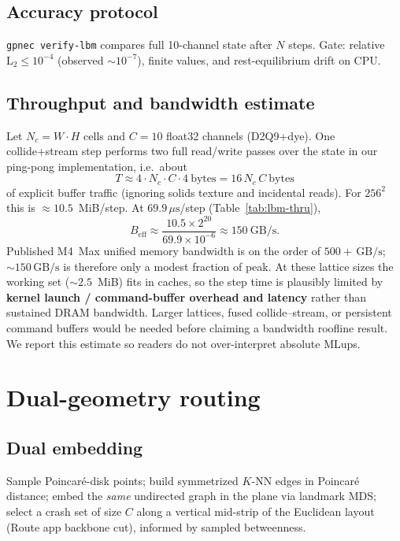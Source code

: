 \documentclass[11pt,a4paper]{article}
\begin{document}
\subsection{Accuracy protocol}
\texttt{gpnec verify-lbm} compares full 10-channel state after $N$ steps.
Gate: relative $\mathrm{L}_2\le10^{-4}$ (observed $\sim10^{-7}$), finite
values, and rest-equilibrium drift on CPU.

\subsection{Throughput and bandwidth estimate}
Let $N_c=W\cdot H$ cells and $C=10$ float32 channels (D2Q9+dye). One
collide+stream step performs two full read/write passes over the state in
our ping-pong implementation, i.e.\ about
\begin{equation}
  T \approx 4\cdot N_c\cdot C\cdot 4\ \mathrm{bytes}
  = 16\,N_c\,C\ \mathrm{bytes}
\end{equation}
of explicit buffer traffic (ignoring solids texture and incidental reads).
For $256^2$ this is $\approx10.5$~MiB/step. At $69.9\,\mu\mathrm{s}$/step
(Table~\ref{tab:lbm-thru}),
\begin{equation}
  B_{\mathrm{eff}} \approx \frac{10.5\times2^{20}}{69.9\times10^{-6}}
  \approx 150\ \mathrm{GB/s}.
\end{equation}
Published M4~Max unified memory bandwidth is on the order of
$500{+}\,\mathrm{GB/s}$; $\sim150\,\mathrm{GB/s}$ is therefore only a
modest fraction of peak. At these lattice sizes the working set
($\sim2.5$~MiB) fits in caches, so the step time is plausibly limited by
\textbf{kernel launch / command-buffer overhead and latency} rather than
sustained DRAM bandwidth. Larger lattices, fused collide--stream, or
persistent command buffers would be needed before claiming a bandwidth
roofline result. We report this estimate so readers do not over-interpret
absolute MLups.

\section{Dual-geometry routing}
\label{sec:route}

\subsection{Dual embedding}
Sample Poincar\'e-disk points; build symmetrized $K$-NN edges in Poincar\'e
distance; embed the \emph{same} undirected graph in the plane via landmark
MDS; select a crash set of size $C$ along a vertical mid-strip of the
Euclidean layout (Route app backbone cut), informed by sampled betweenness.
\end{document}
